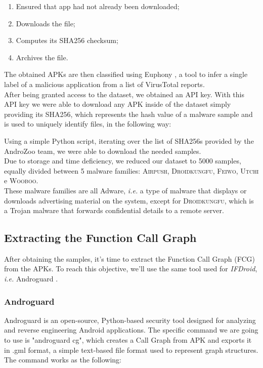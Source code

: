\begin{enumerate}
    \item Ensured that app had not already been downloaded;
    \item Downloads the file;
    \item Computes its SHA256 checksum;
    \item Archives the file.
\end{enumerate}

\noindent The obtained APKs are then classified using Euphony \cite{hurier2017euphony}, a tool to infer a single label of a malicious application from a list of VirusTotal reports. \\ 
After being granted access to the dataset, we obtained an API key. With this API key we were able to download any APK inside of the dataset simply providing its SHA256, which represents the hash value of a malware sample and is used to uniquely identify files, in the following way:

\begin{center}
\end{center}

\vspace{1.5pt}
\noindent Using a simple Python script, iterating over the list of SHA256s provided by the AndroZoo team, we were able to download the needed samples. \\
Due to storage and time deficiency, we reduced our dataset to 5000 samples, equally divided between 5 malware families: \textsc{Airpush}, \textsc{Droidkungfu}, \textsc{Feiwo}, \textsc{Utchi} e \textsc{Wooboo}. \\
These malware families are all Adware, \textit{i.e.} a type of malware that displays or downloads advertising material on the system, except for \textsc{Droidkungfu}, which is a Trojan malware that forwards confidential details to a remote server.

\subsection{Extracting the Function Call Graph}
After obtaining the samples, it's time to extract the Function Call Graph (FCG) from the APKs. To reach this objective, we'll use the same tool used for \textit{IFDroid}, \textit{i.e.} Androguard \cite{desnos2011androguard}.

\subsubsection{Androguard}
Androguard is an open-source, Python-based security tool designed for analyzing and reverse engineering Android applications. The specific command we are going to use is "androguard cg", which creates a Call Graph from APK and exports it in .gml format, a simple text-based file format used to represent graph structures. The command works as the following: 

